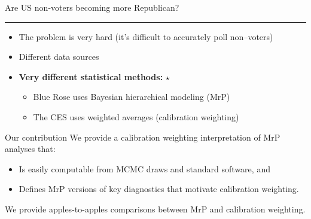 
\begin{frame}{Are US non-voters becoming more Republican?}

\vspace{1em}
%
\hrule
\begin{itemize}
\item The problem is very hard (it's difficult to accurately poll non--voters)
\item Different data sources
%
%
\item \textbf{Very different statistical methods:} $\star$
\begin{itemize}
    \item Blue Rose uses Bayesian hierarchical modeling (MrP)
    \item The CES uses weighted averages (calibration weighting)
\end{itemize}
%
\end{itemize}

\begin{block}{Our contribution}
    We provide a calibration weighting interpretation of MrP analyses that:
\begin{itemize}
    \item Is easily computable from MCMC draws and standard software, and
    \item Defines MrP versions of key diagnostics that motivate calibration weighting.
\end{itemize}
%
We provide apples-to-apples comparisons between
MrP and calibration weighting.
%
\end{block}


\end{frame}


